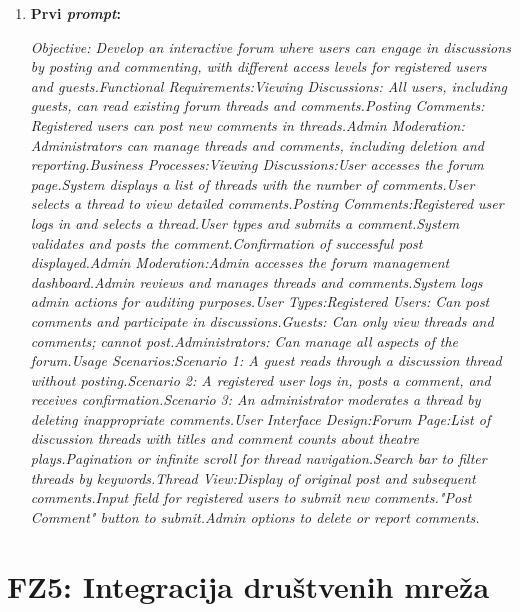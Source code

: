 \begin{enumerate}[itemsep=1ex]
    \item \textbf{Prvi \textit{prompt}:}

         \textit{Objective: Develop an interactive forum where users can engage in discussions by posting and commenting, with different access levels for registered users and guests.Functional Requirements:Viewing Discussions: All users, including guests, can read existing forum threads and comments.Posting Comments: Registered users can post new comments in threads.Admin Moderation: Administrators can manage threads and comments, including deletion and reporting.Business Processes:Viewing Discussions:User accesses the forum page.System displays a list of threads with the number of comments.User selects a thread to view detailed comments.Posting Comments:Registered user logs in and selects a thread.User types and submits a comment.System validates and posts the comment.Confirmation of successful post displayed.Admin Moderation:Admin accesses the forum management dashboard.Admin reviews and manages threads and comments.System logs admin actions for auditing purposes.User Types:Registered Users: Can post comments and participate in discussions.Guests: Can only view threads and comments; cannot post.Administrators: Can manage all aspects of the forum.Usage Scenarios:Scenario 1: A guest reads through a discussion thread without posting.Scenario 2: A registered user logs in, posts a comment, and receives confirmation.Scenario 3: An administrator moderates a thread by deleting inappropriate comments.User Interface Design:Forum Page:List of discussion threads with titles and comment counts about theatre plays.Pagination or infinite scroll for thread navigation.Search bar to filter threads by keywords.Thread View:Display of original post and subsequent comments.Input field for registered users to submit new comments."Post Comment" button to submit.Admin options to delete or report comments.}
\end{enumerate}


\pagebreak
\sloppy  
\section{FZ5: Integracija društvenih mreža}  

\sloppy  
